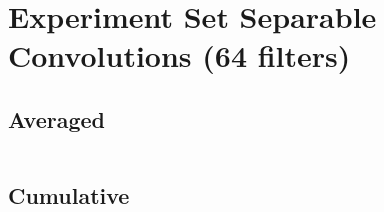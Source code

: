 \documentclass{article}%
\begin{document}
%
\normalsize%
\section{Experiment Set Separable Convolutions (64 filters)}%
\label{sec:Experiment Set Separable Convolutions (64 filters)}%
\subsection{Averaged}%
\label{subsec:Averaged}%
\begin{tabular}{|r|c|}%
\hline%
\end{tabular}

%
\subsection{Cumulative}%
\label{subsec:Cumulative}%
\begin{tabular}{|r|c|}%
\hline%
\end{tabular}

%
\end{document}
